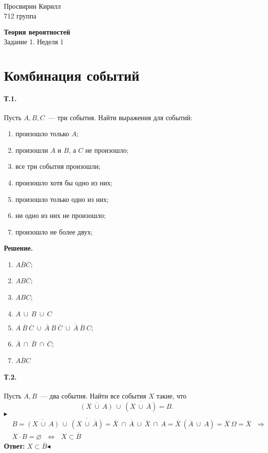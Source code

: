 \documentclass[a4paper,12pt]{article} %
\newcommand{\tb}[1]{\textbf{#1}}
\newcommand{\ol}[1]{\overline{#1}}
\begin{document}

\hfill
\begin{minipage}{4cm}
	Просвирин Кирилл\\
	712 группа\\
\end{minipage}

\begin{center}
	\Large\textbf{Теория вероятностей\\} 
	\large Задание 1. Неделя 1
\end{center}

\section{Комбинация событий}

\paragraph{Т.1.} Пусть $ A, B, C $~--- три события. 
Найти выражения для событий:
\begin{enumerate}
	\item произошло только $ A $;
	\item произошли $ A $ и $ B $, а $ C $ не произошло;
	\item все три события произошли;
	\item произошло хотя бы одно из них;
	\item произошло только одно из них;
	\item ни одно из них не произошло;
	\item произошло не более двух;
\end{enumerate}

\textbf{Решение.}

\begin{enumerate}
	\item $ A\overline{B}\overline{C} $;
	\item $ AB\overline{C} $;
	\item $ ABC $;
	\item $ A~\cup~B~\cup~C $
	\item $ A~\overline{B}~\overline{C}~
	\cup~\overline{A}~B~\overline{C}~
	\cup~\overline{A}~\overline{B}~C $;
	\item $ \overline{A}~\cap~\overline{B}~\cap~\overline{C} $;
	\item $ \overline{ABC} $
\end{enumerate}

\paragraph{Т.2.} Пусть $ A, B $~--- два события. 
Найти все события $ X $ такие, что
\[
	\overline{(X~\cup~A)}~\cup~\overline{(X~\cup~\overline{A})}=B.
\]
$ \blacktriangleright $
\begin{align}&
	B=\overline{(X~\cup~A)}~\cup~\overline{(X~\cup~\overline{A})}=
	\ol{X}~\cap~\ol{A}~\cup~\ol{X}~\cap~A=
	\ol{X}~(\ol{A}~\cup~A)=\ol{X}~\Omega=\ol{X}~~~\Longrightarrow\\
	&X\cdot B=\varnothing~~~\Longleftrightarrow~~~X\subset\ol{B}	
\end{align}
\tb{Ответ: }$ X\subset\ol{B} $\hfill$ \blacktriangleleft $
\end{document}
